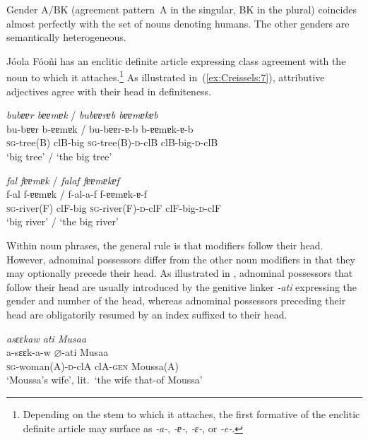 \documentclass[output=paper]{langscibook}
\begin{document}
Gender A/BK (agreement pattern~A in the singular, BK in the plural) coincides
almost perfectly with the set of nouns denoting humans.  The other genders are
semantically heterogeneous.

Jóola Fóoñi has an enclitic definite article expressing class agreement with
the noun to which it attaches.\footnote{ Depending on the stem to which it
  attaches, the first formative of the enclitic definite article may surface as
  \textit{‑a‑}, \textit{‑ɐ‑}, \textit{‑ε‑}, or \textit{­‑e‑}. } As illustrated
in~(\ref{ex:Creissels:7}), attributive adjectives agree with their head in
definiteness.

\ea
  \label{ex:Creissels:7}
  
    \ea\label{ex:Creissels:7a}
      \textit{bubɐɐr bɐɐmɐk} / \textit{bubɐɐrɐb bɐɐmɐkɐb}\\
      \gll bu-bɐɐr b-ɐɐmɐk / bu-bɐɐr-ɐ-b b-ɐɐmɐk-ɐ-b\\
      \textsc{sg}-tree(B) clB-big { } \textsc{sg}-tree(B)-\textsc{d}-clB clB-big-\textsc{d}-clB\\
      \glt `big tree' / `the big tree'


    \ex\label{ex:Creissels:7b}
      \textit{fal fɐɐmɐk} / \textit{falaf fɐɐmɐkɐf}\\
      \gll f-al f-ɐɐmɐk / f-al-a-f f-ɐɐmɐk-ɐ-f\\
      \textsc{sg}-river(F) clF-big { } \textsc{sg}-river(F)-\textsc{d}-clF clF-big-\textsc{d}-clF\\
      \glt `big river' / `the big river'

  \z
\z

Within noun phrases, the general rule is that modifiers follow their head.
However, adnominal possessors differ from the other noun modifiers in that they
may optionally precede their head.  As illustrated in ,
adnominal possessors that follow their head are usually introduced by the
genitive linker \textit{‑ati} expressing the gender and number of the head,
whereas adnominal possessors preceding their head are obligatorily resumed by
an index suffixed to their head.

\ea
  \label{ex:Creissels:8}
  
    \ea\label{ex:Creissels:8a}
    
      \textit{asɛɛkaw ati Musaa}\\
      \gll a-sɛɛk-a-w $\varnothing$-ati Musaa\\
      \textsc{sg}-woman(A)-\textsc{d}-clA clA-\textsc{gen} Moussa(A)\\
      \glt `Moussa's wife', lit.\ `the wife that-of Moussa'
\end{document}
